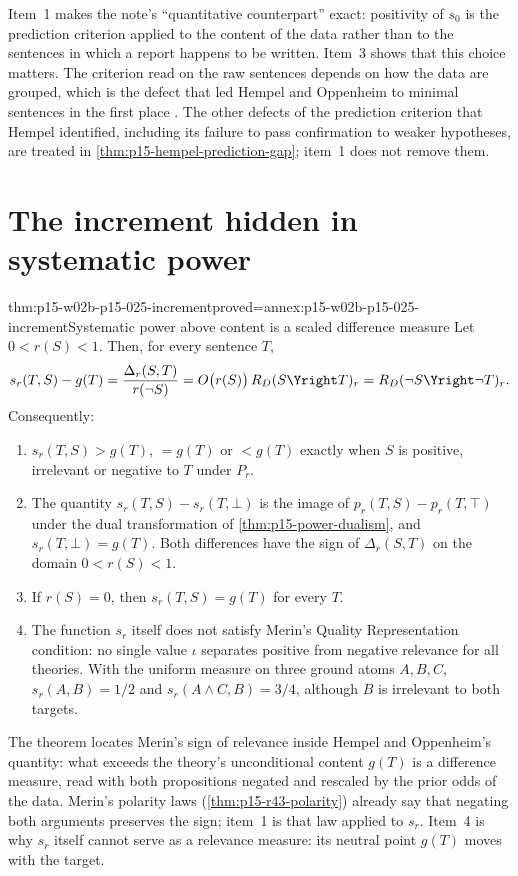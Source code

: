 Item~1 makes the note's ``quantitative counterpart'' exact: positivity
of \(s_0\) is the prediction criterion applied to the content of the data
rather than to the sentences in which a report happens to be written.
Item~3 shows that this choice matters. The criterion read on the raw
sentences depends on how the data are grouped, which is the defect that
led Hempel and Oppenheim to minimal sentences in the first place
\cite[p.~165]{HempelOppenheim1948Explanation}. The other defects of the
prediction criterion that Hempel identified, including its failure to
pass confirmation to weaker hypotheses, are treated in
\cref{thm:p15-hempel-prediction-gap}; item~1 does not remove them.

\section{The increment hidden in systematic power}
\label{sec:p15-w02b-p15-025-increment}

\begin{hbtheorem}{thm:p15-w02b-p15-025-increment}{proved=annex:p15-w02b-p15-025-increment}{Systematic power above content is a scaled difference measure}
Let \(0<r(S)<1\). Then, for every sentence \(T\),
\[
 s_r(T,S)-g(T)
   =\frac{\Delta_r(S,T)}{r(\neg S)}
   =O\bigl(r(S)\bigr)\,R_D(S\Yright T)_r
   =R_D(\neg S\Yright\neg T)_r .
\]
Consequently:
\begin{enumerate}
\item \(s_r(T,S)>g(T)\), \(=g(T)\) or \(<g(T)\) exactly when \(S\) is
positive, irrelevant or negative to \(T\) under \(P_r\).
\item The quantity \(s_r(T,S)-s_r(T,\bot)\) is the image of
\(p_r(T,S)-p_r(T,\top)\) under the dual transformation of
\cref{thm:p15-power-dualism}, and \(s_r(T,\bot)=g(T)\). Both
differences have the sign of \(\Delta_r(S,T)\) on the domain
\(0<r(S)<1\).
\item If \(r(S)=0\), then \(s_r(T,S)=g(T)\) for every \(T\).
\item The function \(s_r\) itself does not satisfy Merin's Quality
Representation condition: no single value \(\iota\) separates
positive from negative relevance for all theories. With the uniform
measure on three ground atoms \(A,B,C\), \(s_r(A,B)=1/2\) and
\(s_r(A\wedge C,B)=3/4\), although \(B\) is irrelevant to both
targets.
\end{enumerate}
\end{hbtheorem}

The theorem locates Merin's sign of relevance inside Hempel and
Oppenheim's quantity: what exceeds the theory's unconditional content
\(g(T)\) is a difference measure, read with both propositions negated
and rescaled by the prior odds of the data. Merin's polarity laws
(\cref{thm:p15-r43-polarity}) already say that negating both
arguments preserves the sign; item~1 is that law applied to \(s_r\).
Item~4 is why \(s_r\) itself cannot serve as a relevance measure: its
neutral point \(g(T)\) moves with the target.

